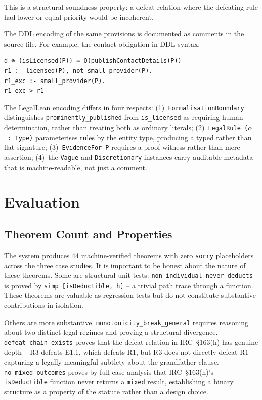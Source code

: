 \documentclass[runningheads]{llncs}
\begin{document}
This is a structural soundness property: a defeat relation where the defeating
rule had lower or equal priority would be incoherent.

The DDL encoding of the same provisions is documented as comments in the source
file. For example, the contact obligation in DDL syntax:

\begin{lstlisting}[style=plain]
d ⊗ (isLicensed(P)) ⇒ O(publishContactDetails(P))
r1 :- licensed(P), not small_provider(P).
r1_exc :- small_provider(P).
r1_exc > r1
\end{lstlisting}

The LegalLean encoding differs in four respects: (1)~\texttt{FormalisationBoundary}
distinguishes \texttt{prominently\_published} from \texttt{is\_licensed} as
requiring human determination, rather than treating both as ordinary literals;
(2)~\texttt{LegalRule~(\(\alpha\)~:~Type)} parameterises rules by the entity
type, producing a typed rather than flat signature; (3)~\texttt{EvidenceFor~P}
requires a proof witness rather than mere assertion; (4)~the \texttt{Vague} and
\texttt{Discretionary} instances carry auditable metadata that is
machine-readable, not just a comment.

\section{Evaluation}

\subsection{Theorem Count and Properties}

The system produces 44 machine-verified theorems with zero \texttt{sorry}
placeholders across the three case studies. It is important to be honest about
the nature of these theorems. Some are structural unit tests:
\texttt{non\_individual\_never\_deducts} is proved by
\texttt{simp~[isDeductible,~h]} -- a trivial path trace through a function.
These theorems are valuable as regression tests but do not constitute substantive
contributions in isolation.

Others are more substantive. \texttt{monotonicity\_break\_general} requires
reasoning about two distinct legal regimes and proving a structural divergence.
\texttt{defeat\_chain\_exists} proves that the defeat relation in IRC~\S163(h)
has genuine depth -- R3 defeats E1.1, which defeats R1, but R3 does not directly
defeat R1 -- capturing a legally meaningful subtlety about the grandfather
clause. \texttt{no\_mixed\_outcomes} proves by full case analysis that
IRC~\S163(h)'s \texttt{isDeductible} function never returns a \texttt{mixed}
result, establishing a binary structure as a property of the statute rather than
a design choice.
\end{document}
